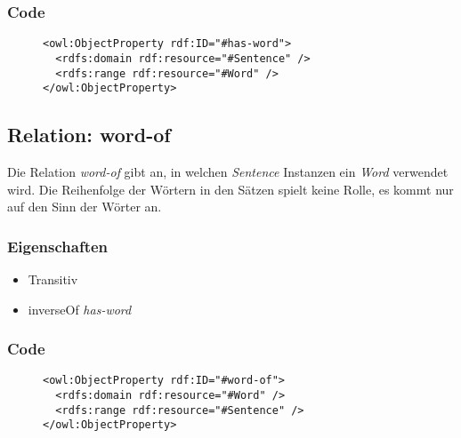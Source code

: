 \documentclass[
    11pt,
    latin1,
    a4paper,
    oneside
]{scrreprt}
\begin{document}
\subsubsection{Code} \label{sec:rel_hasword_code}

\begin{figure}[h]
 \lstset{language=XML}
 \begin{lstlisting}[label=owl:hasword,caption={Die Relation \emph{has-word} gibt an, welches Wort in einem Satz vorkommt}]
<owl:ObjectProperty rdf:ID="#has-word">
  <rdfs:domain rdf:resource="#Sentence" />
  <rdfs:range rdf:resource="#Word" />
</owl:ObjectProperty>
 \end{lstlisting}
\end{figure}


\subsection{Relation: word-of} \label{sec:rel_wordof}

Die Relation \emph{word-of} gibt an, in welchen \emph{Sentence} Instanzen ein \emph{Word} verwendet wird. Die Reihenfolge der W\"ortern in den S\"atzen spielt keine Rolle, es kommt nur auf den Sinn der W\"orter an.

\subsubsection{Eigenschaften} \label{sec:rel_wordof_settings}

\begin{itemize}
  \item Transitiv
  \item inverseOf \emph{has-word}
\end{itemize}

\subsubsection{Code} \label{sec:rel_wordof_code}

\begin{figure}[h]
 \lstset{language=XML}
 \begin{lstlisting}[label=owl:wordof,caption={Die Relation \emph{word-of} gibt an, in welchem Satz das Wort vorkommt}]
<owl:ObjectProperty rdf:ID="#word-of">
  <rdfs:domain rdf:resource="#Word" />
  <rdfs:range rdf:resource="#Sentence" />
</owl:ObjectProperty>
 \end{lstlisting}
\end{figure}
\end{document}

